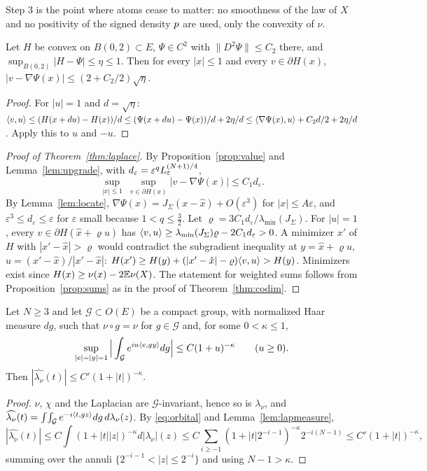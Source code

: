 Step 3 is the point where atoms cease to matter: no smoothness of the law of $X$ and no positivity of the signed
density $p$ are used, only the convexity of $\nu$.

\begin{lemma}\label{lem:upgrade}
Let $H$ be convex on $B(0,2)\subset E$, $\Psi\in C^2$ with $\|D^2\Psi\|\le C_2$ there, and
$\sup_{B(0,2)}|H-\Psi|\le\eta\le1$. Then for every $|x|\le1$ and every $v\in\partial H(x)$,
$|v-\nabla\Psi(x)|\le(2+C_2/2)\sqrt\eta$.
\end{lemma}
\begin{proof}
For $|u|=1$ and $d=\sqrt\eta$: $\langle v, u\rangle\le(H(x+du)-H(x))/d\le(\Psi(x+du)-\Psi(x))/d+2\eta/d\le
\langle \nabla\Psi(x), u\rangle+C_2d/2+2\eta/d$. Apply this to $u$ and $-u$.
\end{proof}

\begin{proof}[Proof of Theorem~\ref{thm:laplace}]
By Proposition~\ref{prop:value} and Lemma~\ref{lem:upgrade}, with $d_\varepsilon=\varepsilon^qL_\varepsilon^{(N+1)/4}$,
\begin{equation}\label{eq:allsub}
\sup_{|x|\le1}\ \sup_{v\in\partial H(x)}|v-\nabla\Psi(x)|\le C_1d_\varepsilon .
\end{equation}
By Lemma~\ref{lem:locate}, $\nabla\Psi(x)=J_\Sigma(x-\hat x)+O(\varepsilon^3)$ for $|x|\le A\varepsilon$, and
$\varepsilon^3\le d_\varepsilon\le\varepsilon$ for $\varepsilon$ small because $1<q\le\frac32$. Let
$\varrho=3C_1d_\varepsilon/\lambda_{\min}(J_\Sigma)$. For $|u|=1$, every $v\in\partial H(\hat x+\varrho u)$ has
$\langle v, u\rangle\ge\lambda_{\min}(J_\Sigma)\varrho-2C_1d_\varepsilon>0$. A minimizer $x'$ of $H$ with $|x'-\hat x|>\varrho$ would
contradict the subgradient inequality at $y=\hat x+\varrho u$, $u=(x'-\hat x)/|x'-\hat x|$:
$H(x')\ge H(y)+(|x'-\hat x|-\varrho)\langle v, u\rangle>H(y)$. Minimizers exist since $H(x)\ge\nu(x)-2\mathbb{E}\nu(X)$. The statement for
weighted sums follows from Proposition~\ref{prop:sums} as in the proof of Theorem~\ref{thm:codim}.
\end{proof}

\begin{lemma}\label{lem:orbit}
Let $N\ge3$ and let $\mathcal G\subset O(E)$ be a compact group, with normalized Haar measure $dg$, such that $\nu\circ g=\nu$
for $g\in\mathcal G$ and, for some $0<\kappa\le1$,
\begin{equation}\label{eq:orbital}
\sup_{|e|=|y|=1}\Big|\int_{\mathcal G}e^{iu\langle e, gy\rangle}dg\Big|\le C(1+u)^{-\kappa}\qquad(u\ge0).
\end{equation}
Then $|\widehat{\lambda_\nu}(t)|\le C'(1+|t|)^{-\kappa}$.
\end{lemma}
\begin{proof}
$\nu$, $\chi$ and the Laplacian are $\mathcal G$-invariant, hence so is $\lambda_\nu$, and
$\widehat{\lambda_\nu}(t)=\int\!\int_{\mathcal G}e^{-i\langle t, gz\rangle}dg\,d\lambda_\nu(z)$. By \eqref{eq:orbital} and
Lemma~\ref{lem:lapmeasure},
\[
|\widehat{\lambda_\nu}(t)|\le C\int(1+|t||z|)^{-\kappa}d|\lambda_\nu|(z)\le C\sum_{i\ge-1}(1+|t|2^{-i-1})^{-\kappa}2^{-i(N-1)}
\le C'(1+|t|)^{-\kappa},
\]
summing over the annuli $\{2^{-i-1}<|z|\le2^{-i}\}$ and using $N-1>\kappa$.
\end{proof}

